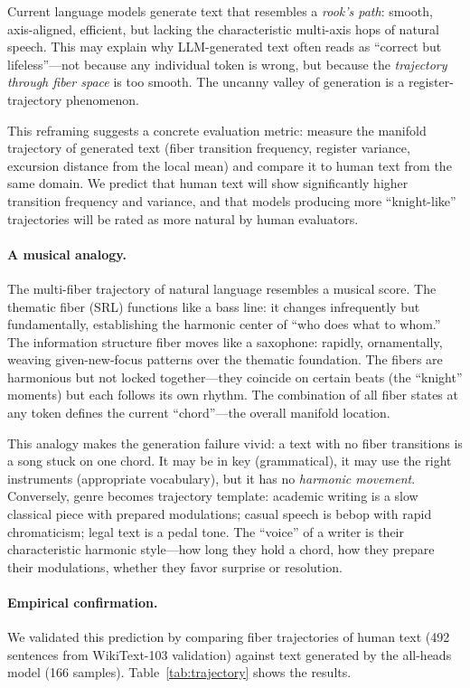 \documentclass[11pt]{article}
\begin{document}
Current language models generate text that resembles a \emph{rook's 
path}: smooth, axis-aligned, efficient, but lacking the characteristic 
multi-axis hops of natural speech. This may explain why LLM-generated 
text often reads as ``correct but lifeless''---not because any individual 
token is wrong, but because the \emph{trajectory through fiber space} is 
too smooth. The uncanny valley of generation is a register-trajectory 
phenomenon.

This reframing suggests a concrete evaluation metric: measure the 
manifold trajectory of generated text (fiber transition frequency, 
register variance, excursion distance from the local mean) and compare 
it to human text from the same domain. We predict that human text will 
show significantly higher transition frequency and variance, and that 
models producing more ``knight-like'' trajectories will be rated as more 
natural by human evaluators.

\paragraph{A musical analogy.}
The multi-fiber trajectory of natural language resembles a musical 
score. The thematic fiber (SRL) functions like a bass line: it changes 
infrequently but fundamentally, establishing the harmonic center of 
``who does what to whom.'' The information structure fiber moves like a 
saxophone: rapidly, ornamentally, weaving given-new-focus patterns over 
the thematic foundation. The fibers are harmonious but not locked 
together---they coincide on certain beats (the ``knight'' moments) 
but each follows its own rhythm. The combination of all fiber states 
at any token defines the current ``chord''---the overall manifold 
location.

This analogy makes the generation failure vivid: a text with no fiber 
transitions is a song stuck on one chord. It may be in key (grammatical), 
it may use the right instruments (appropriate vocabulary), but it has no 
\emph{harmonic movement}. Conversely, genre becomes trajectory template: 
academic writing is a slow classical piece with prepared modulations; 
casual speech is bebop with rapid chromaticism; legal text is a pedal 
tone. The ``voice'' of a writer is their characteristic harmonic style---how 
long they hold a chord, how they prepare their modulations, whether 
they favor surprise or resolution.

\paragraph{Empirical confirmation.}
We validated this prediction by comparing fiber trajectories of human 
text (492 sentences from WikiText-103 validation) against text generated 
by the all-heads model (166 samples). Table~\ref{tab:trajectory} shows 
the results.
\end{document}

